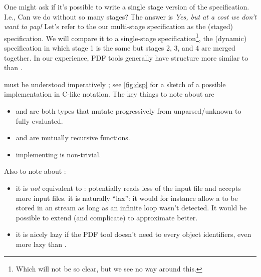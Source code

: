 One might ask if it's possible to write a single stage version of the
specification.  I.e., Can we do without so many stages?
The answer is \emph{Yes, but at a cost we don't want to pay!}
Let's refer to the our multi-stage specification as the \ssp{}
(staged) specification.
%
We will compare it to a single-stage specification\footnote{
  Which will not be so clear, but we see no way around this.
}, the \dsp{}
(dynamic) specification in which stage 1 is the same
but stages 2, 3, and 4 are
merged together.
%
In our experience, PDF tools generally have structure more similar to \dsp{} than \ssp{}.

\dsp must be understood imperatively ;
%
see \cref{fig:dsp} for a sketch
of a possible implementation in C-like notation.
The key things to note about \dsp{} are
\begin{itemize}
\item {} and  are both types that mutate progressively
   from unparsed/unknown to fully evaluated.
\item {} and  are mutually recursive functions.
\item implementing  is non-trivial.
\end{itemize}
Also to note about \dsp{}:
\begin{itemize}
\item it is \emph{not} equivalent to \ssp{}: \dsp{} potentially reads
  less of the input file and accepts more input files.  it is
  naturally ``lax'': it would for instance allow a  to
  be stored in an  stream as long as an infinite loop
  wasn't detected.  It would be possible to extend (and complicate) \dsp{}
  to approximate \ssp{} better.
\item it is nicely lazy if the PDF tool doesn't need to 
  every object identifiers, even more lazy than \ssp{}.
\end{itemize}


